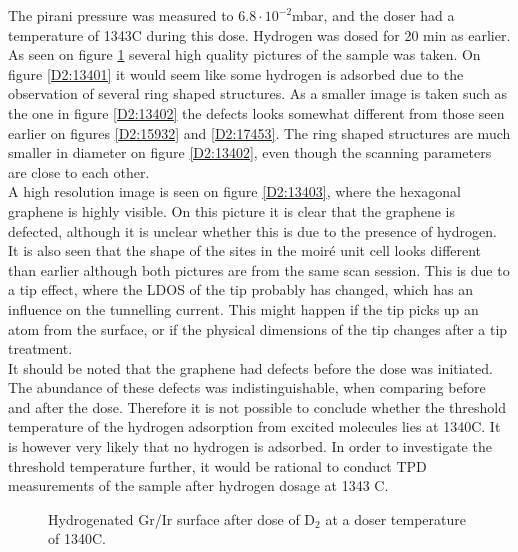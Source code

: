 The pirani pressure was measured to $6.8 \cdot 10^{-2}$mbar, and the doser had a temperature of 1343\degree C during this dose. Hydrogen was dosed for 20 min as earlier. As seen on figure \ref{D2:1340} several high quality pictures of the sample was taken. On figure \ref{D2:13401} it would seem like some hydrogen is adsorbed due to the observation of several ring shaped structures. As a smaller image is taken such as the one in figure \ref{D2:13402} the defects looks somewhat different from those seen earlier on figures \ref{D2:15932} and \ref{D2:17453}. The ring shaped structures are much smaller in diameter on figure \ref{D2:13402}, even though the scanning parameters are close to each other.\\
A high resolution image is seen on figure \ref{D2:13403}, where the hexagonal graphene is highly visible. On this picture it is clear that the graphene is defected, although it is unclear whether this is due to the presence of hydrogen. It is also seen that the shape of the sites in the moiré unit cell looks different than earlier although both pictures are from the same scan session. This is due to a tip effect, where the LDOS of the tip probably has changed, which has an influence on the tunnelling current. This  might happen if the tip picks up an atom from the surface, or if the physical dimensions of the tip changes after a tip treatment.\\
It should be noted that the graphene had defects before the dose was initiated. The abundance of these defects was indistinguishable, when comparing before and after the dose. Therefore it is not possible to conclude whether the threshold temperature of the hydrogen adsorption from excited molecules lies at 1340\degree C. It is however very likely that no hydrogen is adsorbed. In order to investigate the threshold temperature further, it would be rational to conduct TPD measurements of the sample after hydrogen dosage at 1343 \degree C.

\begin{figure}[H]
\caption{Hydrogenated Gr/Ir surface after dose of D$_2$ at a doser temperature of 1340\degree C.}
\label{D2:1340}
\end{figure}


